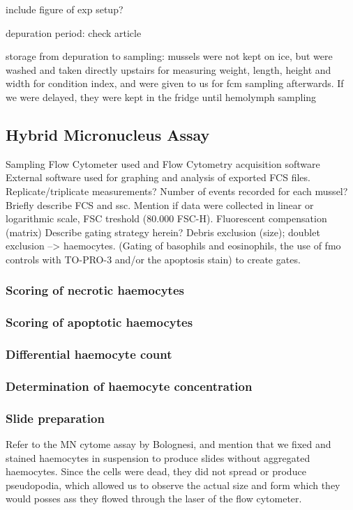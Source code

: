 include figure of exp setup?

depuration period: check article

storage from depuration to sampling: mussels were not kept on ice, but were washed and taken directly upstairs for measuring weight, length, height and width for condition index, and were given to us for \acrshort{fcm} sampling afterwards. If we were delayed, they were kept in the fridge until hemolymph sampling 

\subsection{Hybrid Micronucleus Assay}
Sampling
Flow Cytometer used and Flow Cytometry acquisition software
External software used for graphing and analysis of exported FCS files.
Replicate/triplicate measurements?
Number of events recorded for each mussel?
Briefly describe FCS and \acrshort{ssc}.
Mention if data were collected in linear or logarithmic scale, 
FSC treshold (80.000 FSC-H). 
Fluorescent compensation (matrix)
Describe gating strategy herein? Debris exclusion (size); doublet exclusion --> haemocytes. (Gating of basophils and eosinophils, the use of \acrshort{fmo} controls with TO-PRO-3 and/or the apoptosis stain) to create gates.

\subsubsection{Scoring of necrotic haemocytes}

\subsubsection{Scoring of apoptotic haemocytes}

\subsubsection{Differential haemocyte count}

\subsubsection{Determination of haemocyte concentration}

\subsubsection{Slide preparation}
Refer to the MN cytome assay by Bolognesi, and mention that we fixed and stained haemocytes in suspension to produce slides without aggregated haemocytes. Since the cells were dead, they did not spread or produce pseudopodia, which allowed us to observe the actual size and form which they would posses ass they flowed through the laser of the flow cytometer.


